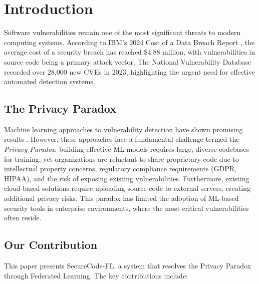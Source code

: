 \documentclass[conference]{IEEEtran}
\begin{document}
\section{Introduction}

Software vulnerabilities remain one of the most significant threats to modern computing systems. According to IBM's 2024 Cost of a Data Breach Report \cite{ibm2024}, the average cost of a security breach has reached \$4.88 million, with vulnerabilities in source code being a primary attack vector. The National Vulnerability Database \cite{nist2024} recorded over 28,000 new CVEs in 2023, highlighting the urgent need for effective automated detection systems.

\subsection{The Privacy Paradox}

Machine learning approaches to vulnerability detection have shown promising results \cite{zhou2019devign, li2018vuldeepecker, fu2022linevul}. However, these approaches face a fundamental challenge termed the \textit{Privacy Paradox}: building effective ML models requires large, diverse codebases for training, yet organizations are reluctant to share proprietary code due to intellectual property concerns, regulatory compliance requirements (GDPR, HIPAA), and the risk of exposing existing vulnerabilities. Furthermore, existing cloud-based solutions require uploading source code to external servers, creating additional privacy risks. This paradox has limited the adoption of ML-based security tools in enterprise environments, where the most critical vulnerabilities often reside.

\subsection{Our Contribution}

This paper presents SecureCode-FL, a system that resolves the Privacy Paradox through Federated Learning. The key contributions include:
\end{document}
